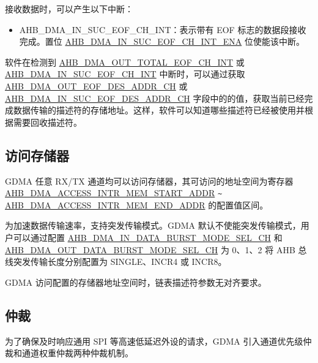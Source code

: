 \documentclass[main\_\_CN.tex]{subfiles}
\begin{document}
接收数据时，可以产生以下中断：
\begin{itemize}
    \item AHB\_DMA\_IN\_SUC\_EOF\_CH\_INT：表示带有 EOF 标志的数据段接收完成。置位 \hyperref[fielddesc:AHBDMAINSUCEOFCHNINTENA]{AHB\_DMA\_IN\_SUC\_EOF\_CH\_INT\_ENA} 位使能该中断。
\end{itemize}


软件在检测到 \hyperref[int:GDMAOUTTOTALEOFINT]{AHB\_DMA\_OUT\_TOTAL\_EOF\_CH\_INT} 或 \hyperref[int:GDMAINSUCEOFINT]{AHB\_DMA\_IN\_SUC\_EOF\_CH\_INT} 中断时，可以通过获取 \hyperref[fielddesc:AHBDMAOUTEOFDESADDRCHN]{AHB\_DMA\_OUT\_EOF\_DES\_ADDR\_CH} 或 \hyperref[fielddesc:AHBDMAINSUCEOFDESADDRCHN]{AHB\_DMA\_IN\_SUC\_EOF\_DES\_ADDR\_CH} 字段中的的值，获取当前已经完成数据传输的描述符的存储地址。这样，软件可以知道哪些描述符已经被使用并根据需要回收描述符。


\subsection{访问存储器}\label{sec:dma-access-inter-ram}
GDMA 任意 RX/TX 通道均可以访问存储器，其可访问的地址空间为寄存器 \hyperref[fielddesc:AHBDMAACCESSINTRMEMSTARTADDR]{AHB\_DMA\_ACCESS\_INTR\_MEM\_START\_ADDR} \verb+~+ \hyperref[fielddesc:AHBDMAACCESSINTRMEMENDADDR]{AHB\_DMA\_ACCESS\_INTR\_MEM\_END\_ADDR} 的配置值区间。

为加速数据传输速率，支持突发传输模式。GDMA 默认不使能突发传输模式，用户可以通过配置 \hyperref[fielddesc:AHBDMAINDATABURSTMODESELCHN]{AHB\_DMA\_IN\_DATA\_BURST\_MODE\_SEL\_CH} 和 \hyperref[fielddesc:AHBDMAOUTDATABURSTMODESELCHN]{AHB\_DMA\_OUT\_DATA\_BURST\_MODE\_SEL\_CH} 为 0、1、2 将 AHB 总线突发传输长度分别配置为 SINGLE、INCR4 或 INCR8。

GDMA 访问配置的存储器地址空间时，链表描述符参数无对齐要求。

\subsection{仲裁}

为了确保及时响应通用 SPI 等高速低延迟外设的请求，GDMA 引入通道优先级仲裁和通道权重仲裁两种仲裁机制。
\end{document}
